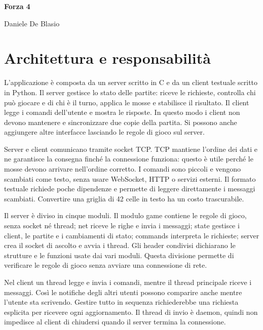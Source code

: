 \documentclass[11pt,a4paper]{article}
\begin{document}
\hypersetup{pageanchor=false}
\begin{titlepage}
\thispagestyle{empty}
\centering
\vspace*{\fill}
{\Huge\bfseries Forza 4\par}
\vspace{12mm}
{\Large Daniele De Blasio\par}
\vspace*{\fill}
\end{titlepage}

\hypersetup{pageanchor=true}
\tableofcontents
\clearpage
{}

\section{Architettura e responsabilità}

L'applicazione è composta da un server scritto in C e da un client testuale scritto in Python. Il server gestisce lo stato delle partite: riceve le richieste, controlla chi può giocare e di chi è il turno, applica le mosse e stabilisce il risultato. Il client legge i comandi dell'utente e mostra le risposte. In questo modo i client non devono mantenere e sincronizzare due copie della partita. Si possono anche aggiungere altre interfacce lasciando le regole di gioco sul server.

Server e client comunicano tramite socket TCP. TCP mantiene l'ordine dei dati e ne garantisce la consegna finché la connessione funziona: questo è utile perché le mosse devono arrivare nell'ordine corretto. I comandi sono piccoli e vengono scambiati come testo, senza usare WebSocket, HTTP o servizi esterni. Il formato testuale richiede poche dipendenze e permette di leggere direttamente i messaggi scambiati. Convertire una griglia di 42 celle in testo ha un costo trascurabile.

Il server è diviso in cinque moduli. Il modulo game contiene le regole di gioco, senza socket né thread; net riceve le righe e invia i messaggi; state gestisce i client, le partite e i cambiamenti di stato; commands interpreta le richieste; server crea il socket di ascolto e avvia i thread. Gli header condivisi dichiarano le strutture e le funzioni usate dai vari moduli. Questa divisione permette di verificare le regole di gioco senza avviare una connessione di rete.

Nel client un thread legge e invia i comandi, mentre il thread principale riceve i messaggi. Così le notifiche degli altri utenti possono comparire anche mentre l'utente sta scrivendo. Gestire tutto in sequenza richiederebbe una richiesta esplicita per ricevere ogni aggiornamento. Il thread di invio è daemon, quindi non impedisce al client di chiudersi quando il server termina la connessione.
\end{document}
